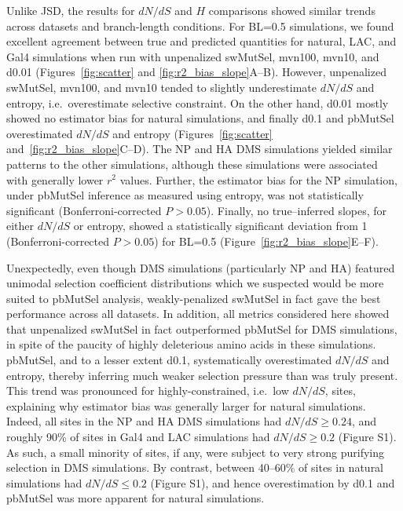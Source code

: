 \documentclass[11pt]{article}
\begin{document}
Unlike JSD, the results for $dN/dS$ and $H$ comparisons showed similar trends across datasets and branch-length conditions. For BL=0.5 simulations, we found excellent agreement between true and predicted quantities for natural, LAC, and Gal4 simulations when run with unpenalized swMutSel, mvn100, mvn10, and d0.01 (Figures~\ref{fig:scatter} and \ref{fig:r2_bias_slope}A--B). However, unpenalized swMutSel, mvn100, and mvn10 tended to slightly underestimate $dN/dS$ and entropy, i.e.\ overestimate selective constraint. On the other hand, d0.01 mostly showed no estimator bias for natural simulations, and finally d0.1 and pbMutSel overestimated $dN/dS$ and entropy (Figures~\ref{fig:scatter} and~\ref{fig:r2_bias_slope}C--D). The NP and HA DMS simulations yielded similar patterns to the other simulations, although these simulations were associated with generally lower $r^2$ values. Further, the estimator bias for the NP simulation, under pbMutSel inference as measured using entropy, was not statistically significant (Bonferroni-corrected $P>0.05$). Finally, no true--inferred slopes, for either $dN/dS$ or entropy, showed a statistically significant deviation from 1 (Bonferroni-corrected $P>0.05$) for BL=0.5 (Figure~\ref{fig:r2_bias_slope}E--F).

Unexpectedly, even though DMS simulations (particularly NP and HA) featured unimodal selection coefficient distributions which we suspected would be more suited to pbMutSel analysis, weakly-penalized swMutSel in fact gave the best performance across all datasets. In addition, all metrics considered here showed that unpenalized swMutSel in fact outperformed pbMutSel for DMS simulations, in spite of the paucity of highly deleterious amino acids in these simulations. pbMutSel, and to a lesser extent d0.1, systematically overestimated $dN/dS$ and entropy, thereby inferring much weaker selection pressure than was truly present. This trend was pronounced for highly-constrained, i.e.\ low $dN/dS$, sites, explaining why estimator bias was generally larger for natural simulations. Indeed, all sites in the NP and HA DMS simulations had $dN/dS\geq0.24$, and roughly 90\% of sites in Gal4 and LAC simulations had $dN/dS\geq0.2$ (Figure S1). As such, a small minority of sites, if any, were subject to very strong purifying selection in DMS simulations. By contrast, between 40--60\% of sites in natural simulations had $dN/dS\leq0.2$ (Figure S1), and hence overestimation by d0.1 and pbMutSel was more apparent for natural simulations.
\end{document}
